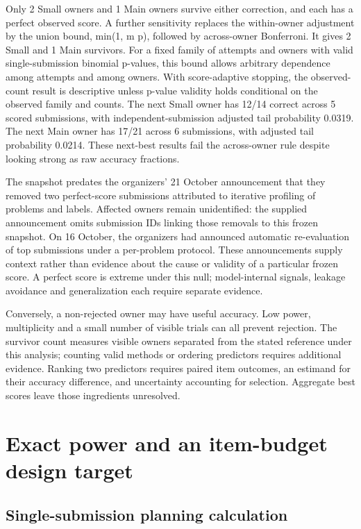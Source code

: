 Only 2 Small owners and 1 Main owners survive either correction, and each has a perfect observed score. A further sensitivity replaces the within-owner adjustment by the union bound, min(1, m p), followed by across-owner Bonferroni. It gives 2 Small and 1 Main survivors. For a fixed family of attempts and owners with valid single-submission binomial p-values, this bound allows arbitrary dependence among attempts and among owners. With score-adaptive stopping, the observed-count result is descriptive unless p-value validity holds conditional on the observed family and counts. The next Small owner has 12/14 correct across 5 scored submissions, with independent-submission adjusted tail probability 0.0319. The next Main owner has 17/21 across 6 submissions, with adjusted tail probability 0.0214. These next-best results fail the across-owner rule despite looking strong as raw accuracy fractions.


The snapshot predates the organizers' 21 October announcement that they removed two perfect-score submissions attributed to iterative profiling of problems and labels. Affected owners remain unidentified: the supplied announcement omits submission IDs linking those removals to this frozen snapshot. On 16 October, the organizers had announced automatic re-evaluation of top submissions under a per-problem protocol. These announcements supply context rather than evidence about the cause or validity of a particular frozen score. \citep{S13} A perfect score is extreme under this null; model-internal signals, leakage avoidance and generalization each require separate evidence.


Conversely, a non-rejected owner may have useful accuracy. Low power, multiplicity and a small number of visible trials can all prevent rejection. The survivor count measures visible owners separated from the stated reference under this analysis; counting valid methods or ordering predictors requires additional evidence. Ranking two predictors requires paired item outcomes, an estimand for their accuracy difference, and uncertainty accounting for selection. Aggregate best scores leave those ingredients unresolved.


\section{Exact power and an item-budget design target}

\subsection{Single-submission planning calculation}


